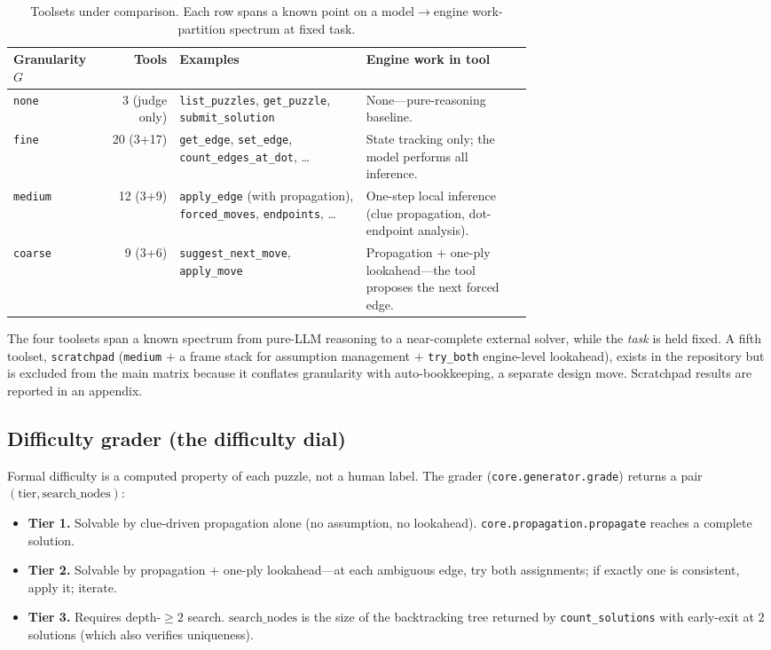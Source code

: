 \documentclass[11pt,letterpaper]{article}
\begin{document}
\begin{table}[h]
\centering\small
\begin{tabular}{@{}l r p{0.36\linewidth} p{0.32\linewidth}@{}}
\toprule
Granularity $G$ & Tools & Examples & Engine work in tool \\
\midrule
\texttt{none}   & 3 (judge only)
  & \texttt{list\_puzzles}, \texttt{get\_puzzle},
    \texttt{submit\_solution}
  & None---pure-reasoning baseline. \\
\texttt{fine}   & 20 (3+17)
  & \texttt{get\_edge}, \texttt{set\_edge},
    \texttt{count\_edges\_at\_dot}, \ldots
  & State tracking only; the model performs all inference. \\
\texttt{medium} & 12 (3+9)
  & \texttt{apply\_edge} (with propagation),
    \texttt{forced\_moves}, \texttt{endpoints}, \ldots
  & One-step local inference (clue propagation, dot-endpoint
    analysis). \\
\texttt{coarse} & 9 (3+6)
  & \texttt{suggest\_next\_move}, \texttt{apply\_move}
  & Propagation $+$ one-ply lookahead---the tool proposes the next
    forced edge. \\
\bottomrule
\end{tabular}
\caption{Toolsets under comparison. Each row spans a known point on
a model$\rightarrow$engine work-partition spectrum at fixed task.}
\label{tab:toolsets}
\end{table}

The four toolsets span a known spectrum from pure-LLM reasoning to
a near-complete external solver, while the \emph{task} is held
fixed. A fifth toolset, \texttt{scratchpad}
(\texttt{medium} $+$ a frame stack for assumption management $+$
\texttt{try\_both} engine-level lookahead), exists in the
repository but is excluded from the main matrix because it
conflates granularity with auto-bookkeeping, a separate design
move. Scratchpad results are reported in an appendix.

\subsection{Difficulty grader (the difficulty dial)}
\label{subsec:grader}

Formal difficulty is a computed property of each puzzle, not a
human label. The grader (\texttt{core.generator.grade}) returns a
pair $(\text{tier}, \text{search\_nodes})$:

\begin{itemize}
  \item \textbf{Tier 1.} Solvable by clue-driven propagation alone
    (no assumption, no lookahead).
    \texttt{core.propagation.propagate} reaches a complete
    solution.
  \item \textbf{Tier 2.} Solvable by propagation $+$ one-ply
    lookahead---at each ambiguous edge, try both assignments; if
    exactly one is consistent, apply it; iterate.
  \item \textbf{Tier 3.} Requires depth-$\ge 2$ search.
    $\text{search\_nodes}$ is the size of the backtracking tree
    returned by \texttt{count\_solutions} with early-exit at $2$
    solutions (which also verifies uniqueness).
\end{itemize}
\end{document}
